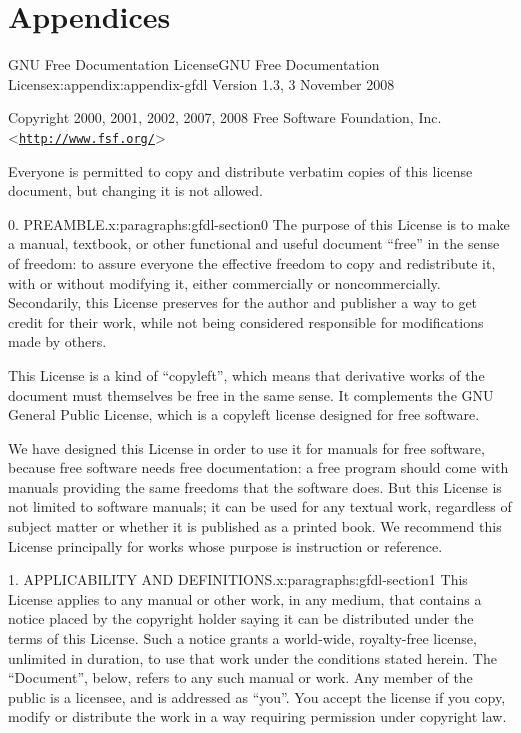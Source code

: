 \documentclass[oneside,10pt,]{book}
\numberwithin{equation}{part}
\begin{document}
\part*{Appendices}%
%
%
\typeout{************************************************}
\typeout{************************************************}
%
\begin{appendixptx}{GNU Free Documentation License}{}{GNU Free Documentation License}{}{}{x:appendix:appendix-gfdl}
Version 1.3, 3 November 2008%
\par
Copyright \textcopyright{} 2000, 2001, 2002, 2007, 2008 Free Software Foundation, Inc. \textless{}\href{http://www.fsf.org/}{\nolinkurl{http://www.fsf.org/}}\textgreater{}%
\par
Everyone is permitted to copy and distribute verbatim copies of this license document, but changing it is not allowed.%
\begin{paragraphs}{0. PREAMBLE.}{x:paragraphs:gfdl-section0}%
The purpose of this License is to make a manual, textbook, or other functional and useful document ``free'' in the sense of freedom: to assure everyone the effective freedom to copy and redistribute it, with or without modifying it, either commercially or noncommercially. Secondarily, this License preserves for the author and publisher a way to get credit for their work, while not being considered responsible for modifications made by others.%
\par
This License is a kind of ``copyleft'', which means that derivative works of the document must themselves be free in the same sense. It complements the GNU General Public License, which is a copyleft license designed for free software.%
\par
We have designed this License in order to use it for manuals for free software, because free software needs free documentation: a free program should come with manuals providing the same freedoms that the software does. But this License is not limited to software manuals; it can be used for any textual work, regardless of subject matter or whether it is published as a printed book. We recommend this License principally for works whose purpose is instruction or reference.%
\end{paragraphs}%
\begin{paragraphs}{1. APPLICABILITY AND DEFINITIONS.}{x:paragraphs:gfdl-section1}%
This License applies to any manual or other work, in any medium, that contains a notice placed by the copyright holder saying it can be distributed under the terms of this License. Such a notice grants a world-wide, royalty-free license, unlimited in duration, to use that work under the conditions stated herein. The ``Document'', below, refers to any such manual or work. Any member of the public is a licensee, and is addressed as ``you''. You accept the license if you copy, modify or distribute the work in a way requiring permission under copyright law.%

\end{paragraphs}
\end{appendixptx}
\end{document}

